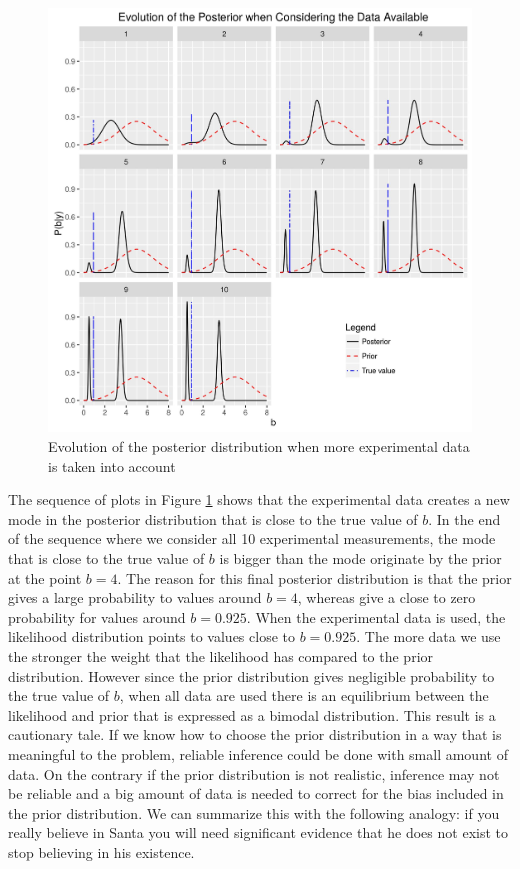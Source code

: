 \documentclass[12pt]{book}
\begin{document}
\begin{figure}[H]
\centering
\includegraphics[scale=0.7]{./FigChap3/posterior_evolution}
\caption{Evolution of the posterior distribution when more experimental data is taken into account}
\label{figpostevolution}
\end{figure}

The sequence of plots in Figure \ref{figpostevolution} shows that the experimental data creates a new mode
in the posterior distribution that is close to the true value of $b$. In the end of the sequence where we consider
all 10 experimental measurements, the mode that is close to the true value of $b$ is bigger than the mode originate
by the prior at the point $b=4$. The reason for this final posterior distribution is that the prior gives a large
probability to values around $b=4$, whereas give a close to zero probability for values around $b=0.925$.
When the experimental data is used, the likelihood distribution points to values close to $b=0.925$. The more data
we use the stronger the weight that the likelihood has compared to the prior distribution. However since
the prior distribution gives negligible probability to the true value of $b$, when all data are used there
is an equilibrium between the likelihood and prior that is expressed as a bimodal distribution. This result
is a cautionary tale. If we know how to choose the prior distribution in a way that is meaningful to the
problem, reliable inference could be done with small amount of data. On the contrary if the prior distribution
is not realistic, inference may not be reliable and a big amount of data is needed
to correct for the bias included in the prior distribution. We can summarize this with the following analogy: if you really believe
in Santa you will need significant  evidence that he does not exist to stop believing in his existence.
\end{document}
